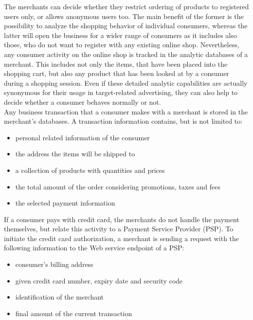 The merchants can decide whether they restrict ordering of products to registered users only, or allows anonymous users too. The main benefit of the former is the possibility to analyze the shopping behavior of individual consumers, whereas the latter will open the business for a wider range of consumers as it includes also those, who do not want to register with any existing online shop. Nevertheless, any consumer activity on the online shop is tracked in the analytic databases of a merchant. This includes not only the items, that have been placed into the shopping cart, but also any product that has been looked at by a consumer during a shopping session. Even if these detailed analytic capabilities are actually synonymous for their usage in target-related advertising, they can also help to decide whether a consumer behaves normally or not. \\

Any business transaction that a consumer makes with a merchant is stored in the merchant's databases. A transaction information contains, but is not limited to:\@

\begin{itemize}
		\item personal related information of the consumer
		\item the address the items will be shipped to
		\item a collection of products with quantities and prices
		\item the total amount of the order considering promotions, taxes and fees
		\item the selected payment information
\end{itemize}

If a consumer pays with credit card, the merchants do not handle the payment themselves, but relate this activity to a Payment Service Provider (\gls{PSP}). To initiate the credit card authorization, a merchant is sending a request with the following information to the Web service endpoint of a \gls{PSP}: \@

\begin{itemize}
    \item consumer's billing address
    \item given credit card number, expiry date and security code
    \item identification of the merchant
    \item final amount of the current transaction
\end{itemize}

